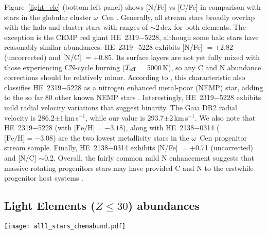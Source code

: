 \documentclass[twocolumn]{aastex63}
\newcommand{\kms}{km\,s$^{-1}$}
\begin{document}
Figure~\ref{light_ele} (bottom left panel) shows [N/Fe] vs [C/Fe] in comparison with stars in the globular cluster $\omega$~Cen \citep{Marino12}. Generally, all stream stars broadly overlap with the halo and cluster stars with ranges of $\sim2$\,dex for both elements. The exception is the CEMP red giant HE~2319$-$5228, although some halo stars have reasonably similar abundances. HE~2319$-$5228 exhibits [N/Fe] $=+$2.82 (uncorrected) and [N/C] $=+$0.85. Its surface layers are not yet fully mixed with those experiencing CN-cycle burning ($T_{\rm eff}$ = 5000\,K), so any C and N abundance corrections should be relatively minor. According to \citet{Johnson07}, this characteristic also classifies HE~2319$-$5228 as a nitrogen enhanced metal-poor (NEMP) star, adding to the so far 80 other known NEMP stars \citep{simpson19}. 
Interestingly, HE~2319$-$5228 exhibits mild radial velocity variations that suggest binarity. The Gaia DR2 radial velocity is 286.2$\pm1$\,\kms \citep{gaia18}, while our value is 293.7$\pm$2\,\kms. We also note that HE~2319$-$5228 (with $\mbox{[Fe/H]}=-3.18$), along with HE~2138$-$0314 ($\mbox{[Fe/H]}=-3.08$) are the two lowest metallicity stars in the $\omega$~Cen progenitor stream sample. Finally, HE~2138$-$0314 exhibits [N/Fe] $=+$0.71 (uncorrected) and [N/C] $\sim$0.2. Overall, the fairly common mild N enhancement suggests that massive rotating progenitors stars may have provided C and N to the erstwhile progenitor host systems \citep{ekstroem08}.




\subsection{Light Elements ($Z\le30$) abundances}
\label{sec:light}

\begin{figure*}[!ht]
 \begin{flushleft}
    \texttt{[image: alll\_stars\_chemabund.pdf]}
    \caption{\label{light_ele} 
    Abundance ratios in our stream stars.  The symbol colors and shapes are indicated in the legend.  The [C/Fe] ratios have been corrected as described in \citet{Placco14}.  There is good agreement with the abundances in the non-CEMP stars from \citet{Yong13a}, which are shown for comparison as small black open circles. The bottom row shows several abundance ratio pairs that are commonly correlated or anti-correlated in globular cluster stars.  The globular cluster abundances, except for $\omega$~Cen, are adopted from \citet{carretta09} for all elements, except for [C/Fe] and [N/Fe], which are adopted from \citet{Roediger14}.  C and N abundance of $\omega$~Cen stars are from \citet{Marino12}. We note that  \citet{carretta09}'s and our values for Na I and Al I are corrected for NLTE (Na I; \citealt{Lind11}, Al I; \citealt{nordlander17}). }
 \end{flushleft}
\end{figure*}
\end{document}
